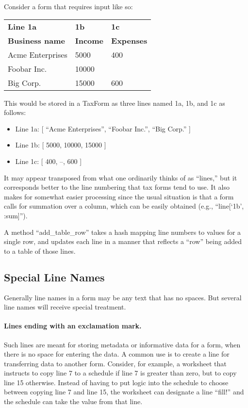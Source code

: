 \documentclass[12pt]{article}
\begin{document}
Consider a form that requires input like so:
\begin{center}
\begin{tabular}{|l|l|l|}
\hline
\textbf{Line 1a} & \textbf{1b} & \textbf{1c} \\
\textbf{Business name} & \textbf{Income} & \textbf{Expenses} \\
\hline
Acme Enterprises & 5000 & 400 \\
\hline
Foobar Inc. & 10000 & \\
\hline
Big Corp. & 15000 & 600 \\
\hline
\end{tabular}
\end{center}
This would be stored in a TaxForm as three lines named 1a, 1b, and 1c as
follows:
\begin{itemize}
\item Line 1a: [ ``Acme Enterprises'', ``Foobar Inc.'', ``Big Corp.'' ]
\item Line 1b: [ 5000, 10000, 15000 ]
\item Line 1c: [ 400, --, 600 ]
\end{itemize}
It may appear transposed from what one ordinarily thinks of as ``lines,'' but it
corresponds better to the line numbering that tax forms tend to use. It also
makes for somewhat easier processing since the usual situation is that a form
calls for summation over a column, which can be easily obtained (e.g.,
``line[`1b', :sum]'').

A method ``add\_table\_row'' takes a hash mapping line numbers to values for a
single row, and updates each line in a manner that reflects a ``row'' being
added to a table of those lines.

\subsection{Special Line Names}

Generally line names in a form may be any text that has no spaces. But several
line names will receive special treatment.

\paragraph{Lines ending with an exclamation mark.} Such lines are meant for
storing metadata or informative data for a form, when there is no space for
entering the data. A common use is to create a line for transferring data to
another form. Consider, for example, a worksheet that instructs to copy line 7
to a schedule if line 7 is greater than zero, but to copy line 15 otherwise.
Instead of having to put logic into the schedule to choose between copying line
7 and line 15, the worksheet can designate a line ``fill!\@'' and the schedule
can take the value from that line.
\end{document}
